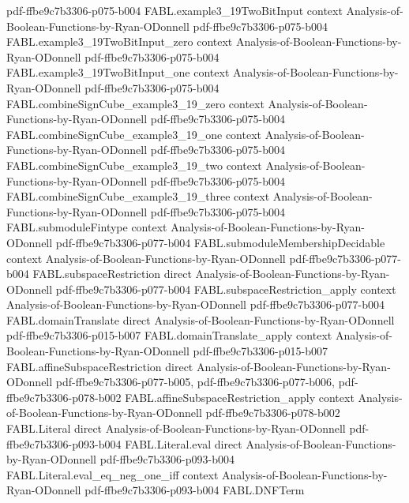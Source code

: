 \begin{theorem}
  {pdf-ffbe9c7b3306-p075-b004}
\proofstep
  {FABL.example3_19TwoBitInput}
  {context}
  {Analysis-of-Boolean-Functions-by-Ryan-ODonnell}
  {pdf-ffbe9c7b3306-p075-b004}
\proofstep
  {FABL.example3_19TwoBitInput_zero}
  {context}
  {Analysis-of-Boolean-Functions-by-Ryan-ODonnell}
  {pdf-ffbe9c7b3306-p075-b004}
\proofstep
  {FABL.example3_19TwoBitInput_one}
  {context}
  {Analysis-of-Boolean-Functions-by-Ryan-ODonnell}
  {pdf-ffbe9c7b3306-p075-b004}
\proofstep
  {FABL.combineSignCube_example3_19_zero}
  {context}
  {Analysis-of-Boolean-Functions-by-Ryan-ODonnell}
  {pdf-ffbe9c7b3306-p075-b004}
\proofstep
  {FABL.combineSignCube_example3_19_one}
  {context}
  {Analysis-of-Boolean-Functions-by-Ryan-ODonnell}
  {pdf-ffbe9c7b3306-p075-b004}
\proofstep
  {FABL.combineSignCube_example3_19_two}
  {context}
  {Analysis-of-Boolean-Functions-by-Ryan-ODonnell}
  {pdf-ffbe9c7b3306-p075-b004}
\proofstep
  {FABL.combineSignCube_example3_19_three}
  {context}
  {Analysis-of-Boolean-Functions-by-Ryan-ODonnell}
  {pdf-ffbe9c7b3306-p075-b004}
\proofstep
  {FABL.submoduleFintype}
  {context}
  {Analysis-of-Boolean-Functions-by-Ryan-ODonnell}
  {pdf-ffbe9c7b3306-p077-b004}
\proofstep
  {FABL.submoduleMembershipDecidable}
  {context}
  {Analysis-of-Boolean-Functions-by-Ryan-ODonnell}
  {pdf-ffbe9c7b3306-p077-b004}
\proofstep
  {FABL.subspaceRestriction}
  {direct}
  {Analysis-of-Boolean-Functions-by-Ryan-ODonnell}
  {pdf-ffbe9c7b3306-p077-b004}
\proofstep
  {FABL.subspaceRestriction_apply}
  {context}
  {Analysis-of-Boolean-Functions-by-Ryan-ODonnell}
  {pdf-ffbe9c7b3306-p077-b004}
\proofstep
  {FABL.domainTranslate}
  {direct}
  {Analysis-of-Boolean-Functions-by-Ryan-ODonnell}
  {pdf-ffbe9c7b3306-p015-b007}
\proofstep
  {FABL.domainTranslate_apply}
  {context}
  {Analysis-of-Boolean-Functions-by-Ryan-ODonnell}
  {pdf-ffbe9c7b3306-p015-b007}
\proofstep
  {FABL.affineSubspaceRestriction}
  {direct}
  {Analysis-of-Boolean-Functions-by-Ryan-ODonnell}
  {pdf-ffbe9c7b3306-p077-b005,
    pdf-ffbe9c7b3306-p077-b006,
    pdf-ffbe9c7b3306-p078-b002}
\proofstep
  {FABL.affineSubspaceRestriction_apply}
  {context}
  {Analysis-of-Boolean-Functions-by-Ryan-ODonnell}
  {pdf-ffbe9c7b3306-p078-b002}
\proofstep
  {FABL.Literal}
  {direct}
  {Analysis-of-Boolean-Functions-by-Ryan-ODonnell}
  {pdf-ffbe9c7b3306-p093-b004}
\proofstep
  {FABL.Literal.eval}
  {direct}
  {Analysis-of-Boolean-Functions-by-Ryan-ODonnell}
  {pdf-ffbe9c7b3306-p093-b004}
\proofstep
  {FABL.Literal.eval_eq_neg_one_iff}
  {context}
  {Analysis-of-Boolean-Functions-by-Ryan-ODonnell}
  {pdf-ffbe9c7b3306-p093-b004}
\proofstep
  {FABL.DNFTerm}

\end{theorem}
